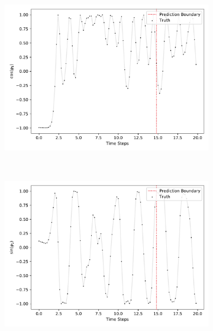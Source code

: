 			\begin{figure}
				\centering
				\begin{subfigure}{0.5\linewidth}
					\centering
					\includegraphics[width=\linewidth]{figures/experiments/environments/observations-acrobot-gym-N0-D0.pdf}
				\end{subfigure}%
				~
				\begin{subfigure}{0.5\linewidth}
					\centering
					\includegraphics[width=\linewidth]{figures/experiments/environments/observations-acrobot-gym-N0-D1.pdf}
				\end{subfigure} \\
				\begin{subfigure}{0.5\linewidth}
					\centering

\end{subfigure}
\end{figure}

